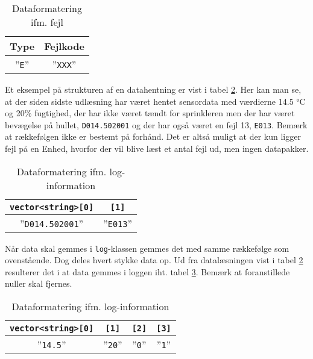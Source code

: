 \begin{table}[h]
	\caption{Dataformatering ifm. fejl}
	\centering
	\begin{tabular}{|c|c|}
		\hline 
		\textbf{Type} & \textbf{Fejlkode} \\ 
		\hline 
		''\verb+E+'' & ''\verb+XXX+'' \\ 
		\hline 
	\end{tabular} 
	\label{table:SWDataprotokol-error}
\end{table}

Et eksempel på strukturen af en datahentning er vist i tabel \ref{table:SWDataprotokol-eksempel}. Her kan man se, at der siden sidste udlæsning har været hentet sensordata med værdierne 14.5 °C og 20\% fugtighed, der har ikke været tændt for sprinkleren men der har været bevægelse på hullet, \verb+D014.502001+ og der har også været en fejl 13, \verb+E013+. Bemærk at rækkefølgen ikke er bestemt på forhånd. Det er altså muligt at der kun ligger fejl på en Enhed, hvorfor der vil blive læst et antal fejl ud, men ingen datapakker.

\begin{table}[h]
	\caption{Dataformatering ifm. log-information}
	\centering
	\begin{tabular}{|c|c|}
		\hline
		\verb+vector<string>[0]+ & \verb+[1]+ \\
		\hline 
		''\verb+D014.502001+'' & ''\verb+E013+'' \\ 
		\hline 
	\end{tabular} 
	\label{table:SWDataprotokol-eksempel}
\end{table}

Når data skal gemmes i \verb+log+-klassen gemmes det med samme rækkefølge som ovenstående. Dog deles hvert stykke data op. Ud fra datalæsningen vist i tabel \ref{table:SWDataprotokol-eksempel} resulterer det i at data gemmes i loggen iht. tabel \ref{table:SWDataprotokol-log-eksempel}. Bemærk at foranstillede nuller skal fjernes.

\begin{table}[h]
	\caption{Dataformatering ifm. log-information}
	\centering
	\begin{tabular}{|c|c|c|c|}
		\hline
		\verb+vector<string>[0]+ & \verb+[1]+ & \verb+[2]+ & \verb+[3]+\\
		\hline 
		''\verb+14.5+'' & ''\verb+20+'' & ''\verb+0+'' & ''\verb+1+'' \\ 
		\hline 
	\end{tabular} 
	\label{table:SWDataprotokol-log-eksempel}
\end{table}